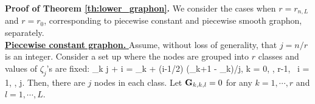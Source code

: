 

  

 \noindent
 {\bf Proof of Theorem \ref{th:lower_graphon}. } 
We consider the cases when $r = r_{n,L}$ and $r=r_0$,
corresponding to piecewise constant and piecewise smooth graphon, separately.
\\
 

\underline{\bf Piecewise constant graphon. }
Assume, without loss of generality, that $j = n/r$ is an integer.  
Consider a set up where the nodes are grouped into $r$ classes and 
values of $\zeta_j$'s are fixed:   
\bes
\zeta_{k j + i} = \beta_k + (i-1/2)  (\beta_{k+1} - \beta_k)/j,
\quad k = 0, \cdots, r-1, \ i = 1, \cdots, j.
\ees
Then, there are $j$ nodes in each class.   
Let $\mathbf{G}_{k,k,l} =0$ for any $k=1, \cdots, r$ and $l=1, \cdots, L$.




